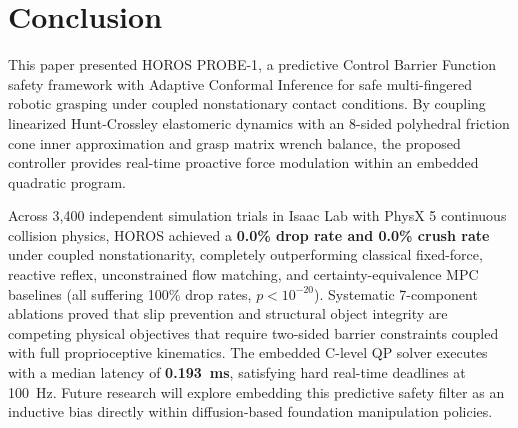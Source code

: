 \section{Conclusion}
\label{sec:conclusion}

This paper presented HOROS PROBE-1, a predictive Control Barrier Function safety framework with Adaptive Conformal Inference for safe multi-fingered robotic grasping under coupled nonstationary contact conditions. By coupling linearized Hunt-Crossley elastomeric dynamics with an 8-sided polyhedral friction cone inner approximation and grasp matrix wrench balance, the proposed controller provides real-time proactive force modulation within an embedded quadratic program. 

Across 3,400 independent simulation trials in Isaac Lab with PhysX 5 continuous collision physics, HOROS achieved a \textbf{0.0\% drop rate and 0.0\% crush rate} under coupled nonstationarity, completely outperforming classical fixed-force, reactive reflex, unconstrained flow matching, and certainty-equivalence MPC baselines (all suffering 100\% drop rates, $p < 10^{-20}$). Systematic 7-component ablations proved that slip prevention and structural object integrity are competing physical objectives that require two-sided barrier constraints coupled with full proprioceptive kinematics. The embedded C-level QP solver executes with a median latency of \textbf{0.193~ms}, satisfying hard real-time deadlines at 100~Hz. Future research will explore embedding this predictive safety filter as an inductive bias directly within diffusion-based foundation manipulation policies.
